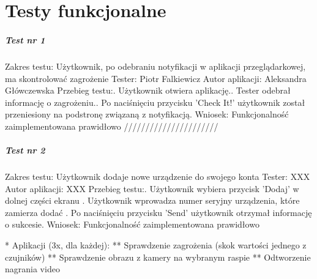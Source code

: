 \chapter{Testy funkcjonalne}


\paragraph{Test nr 1}
Zakres testu:\newline
Użytkownik, po odebraniu notyfikacji w aplikacji przeglądarkowej, ma skontrolować zagrożenie\newline
Tester: Piotr Falkiewicz\newline
Autor aplikacji: Aleksandra Główczewska\newline
Przebieg testu:. Użytkownik otwiera aplikację.. Tester odebrał informację o zagrożeniu.. Po naciśnięciu przycisku 'Check It!' użytkownik został przeniesiony na podstronę związaną z notyfikacją.\newline
Wniosek:\newline
Funkcjonalność zaimplementowana prawidłowo\newline
\newline
//////////////////////\newline
\paragraph{Test nr 2}
Zakres testu:\newline
Użytkownik dodaje nowe urządzenie do swojego konta\newline
Tester: XXX \newline
Autor aplikacji: XXX \newline
Przebieg testu:. Użytkownik wybiera przycisk 'Dodaj' w dolnej części ekranu . Użytkownik wprowadza numer seryjny urządzenia, które zamierza dodać . Po naciśnięciu przycisku 'Send' użytkownik otrzymał informację o sukcesie.\newline
Wniosek:\newline
Funkcjonalność zaimplementowana prawidłowo\newline

 
 
 
 * Aplikacji (3x, dla każdej):\newline
 ** Sprawdzenie zagrożenia (skok wartości jednego z czujników)\newline
 ** Sprawdzenie obrazu z kamery na wybranym raspie\newline
 ** Odtworzenie nagrania video\newline

